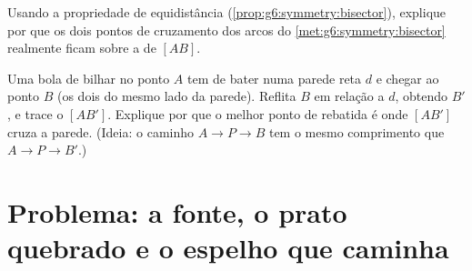 \begin{exercise}[$\star\star$]\label{exo:g6:symmetry:11}
Usando a propriedade de equidistância
(\cref{prop:g6:symmetry:bisector}), explique por que os dois pontos de
cruzamento dos arcos do \cref{met:g6:symmetry:bisector} realmente
ficam sobre a  de $[AB]$.
\end{exercise}

\begin{exercise}[$\star\star\star$]\label{exo:g6:symmetry:12}
Uma bola de bilhar no ponto $A$ tem de bater numa parede reta $d$ e
chegar ao ponto $B$ (os dois do mesmo lado da parede). Reflita $B$ em
relação a $d$, obtendo $B'$, e trace o  $[AB']$. Explique por
que o melhor ponto de rebatida é onde $[AB']$ cruza a parede. (Ideia: o
caminho $A \to P \to B$ tem o mesmo comprimento que
$A \to P \to B'$.)
\end{exercise}

\section{Problema: a fonte, o prato quebrado e o espelho que caminha}

